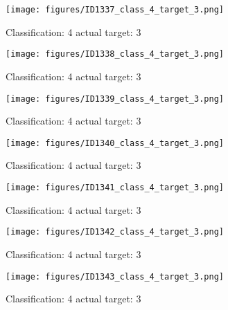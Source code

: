 \begin{figure}[h!]
\begin{center}
\texttt{[image: figures/ID1337\_class\_4\_target\_3.png]}
\end{center}
\caption{ Classification: 4 actual target: 3}
\label{fig:ID1337_class_4_target_3}
\end{figure}
\begin{figure}[h!]
\begin{center}
\texttt{[image: figures/ID1338\_class\_4\_target\_3.png]}
\end{center}
\caption{ Classification: 4 actual target: 3}
\label{fig:ID1338_class_4_target_3}
\end{figure}
\begin{figure}[h!]
\begin{center}
\texttt{[image: figures/ID1339\_class\_4\_target\_3.png]}
\end{center}
\caption{ Classification: 4 actual target: 3}
\label{fig:ID1339_class_4_target_3}
\end{figure}
\begin{figure}[h!]
\begin{center}
\texttt{[image: figures/ID1340\_class\_4\_target\_3.png]}
\end{center}
\caption{ Classification: 4 actual target: 3}
\label{fig:ID1340_class_4_target_3}
\end{figure}
\begin{figure}[h!]
\begin{center}
\texttt{[image: figures/ID1341\_class\_4\_target\_3.png]}
\end{center}
\caption{ Classification: 4 actual target: 3}
\label{fig:ID1341_class_4_target_3}
\end{figure}
\begin{figure}[h!]
\begin{center}
\texttt{[image: figures/ID1342\_class\_4\_target\_3.png]}
\end{center}
\caption{ Classification: 4 actual target: 3}
\label{fig:ID1342_class_4_target_3}
\end{figure}
\begin{figure}[h!]
\begin{center}
\texttt{[image: figures/ID1343\_class\_4\_target\_3.png]}
\end{center}
\caption{ Classification: 4 actual target: 3}
\label{fig:ID1343_class_4_target_3}
\end{figure}

